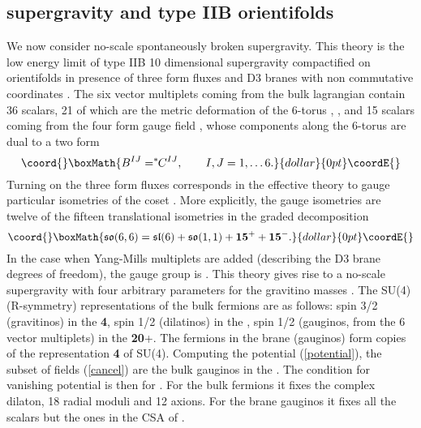 \documentclass[a4paper,12pt]{article}
\begin{document}
\subsection{\coordHE{} supergravity and type IIB orientifolds}
We now consider no-scale \coordHE{}  spontaneously broken supergravity. This theory is the low energy
limit of
type IIB 10 dimensional supergravity compactified on orientifolds in presence of three form fluxes
and \coordHE{}
D3 branes with non commutative coordinates \cite{fp,kst}.
The six \coordHE{} vector multiplets coming from the bulk lagrangian
contain 36 scalars,  21 of which are the metric deformation of
the 6-torus \coordHE{}  \coordHE{}, \coordHE{}, and 15 scalars coming
from the four form gauge field \coordHE{}, whose
components along the 6-torus are dual to a two form
$$\coord{}\boxMath{B^{IJ}=^*\!\!C^{IJ}, \qquad I,J=1,\dots 6.}{dollar}{0pt}\coordE{}$$ Turning on the
three form fluxes corresponds in the effective theory to gauge
particular isometries of the coset
\coordHE{} \cite{adfl3}. More explicitly,
the gauge isometries are twelve of the fifteen translational
isometries in the graded decomposition \cite{adfl3}
$$\coord{}\boxMath{\fso(6,6)=\fsl(6)+\fso(1,1) +{\mathbf{15}^+}+{\mathbf{15}^-}.}{dollar}{0pt}\coordE{}$$
In the case when  Yang-Mills \coordHE{} multiplets are added (describing the D3 brane degrees of freedom),
the
gauge group is \coordHE{}. This theory gives rise to a no-scale supergravity with four
arbitrary parameters for the gravitino masses \cite{tz}.
The SU(4) (R-symmetry) representations of the bulk fermions are as follows:
\noindent spin 3/2 (gravitinos)  in the {\bf 4},
\noindent spin 1/2 (dilatinos) in the \coordHE{},
\noindent spin 1/2 (gauginos, from the 6 vector multiplets) in the {\bf 20}+\coordHE{}.
The fermions in the brane (gauginos) form \coordHE{} copies of the representation {\bf 4} of SU(4).
Computing the potential (\ref{potential}), the subset of fields \coordHE{} (\ref{cancel}) are the
bulk
gauginos  in the \coordHE{}. The condition for vanishing potential \cite{dfv}
is then \coordHE{} for \coordHE{}. For the bulk fermions it fixes the complex dilaton, 18 radial
moduli
and 12 axions. For the brane gauginos it fixes all the scalars but the ones in the CSA of \coordHE{}.
\end{document}
